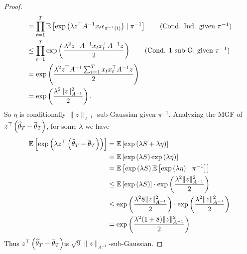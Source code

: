 \begin{proof}
\begin{align*}
    &=  \prod_{t=1}^T\mathbb{E}\left[\exp\left(\lambda z^\top A^{-1}x_{t}\epsilon_{\pi^{-1}(t)}\right) \mid \pi^{-1} \right]  \tag{Cond. Ind. given  $\pi^{-1}$} \\
    &\leq \prod_{t=1}^T\exp\left(\frac{\lambda^2 z^\top A^{-1}x_{t}x_{t}^\top A^{-1} z}{2}\right)  \tag{Cond. 1-sub-G. given $\pi^{-1}$} \\
    &= \exp\left(\frac{\lambda^2 z^\top A^{-1}\sum_{t=1}^Tx_{t}x_{t}^\top A^{-1} z}{2}\right)\\
    &= \exp\left(\frac{\lambda^2 \|z\|_{A^{-1}}^2}{2}\right).    
\end{align*}
So $\eta$ is conditionally $\|z\|_{A^{-1}}$-sub-Gaussian given $\pi^{-1}$. Analyzing the MGF of $z^\top\left(\widehat{\theta}_T -\overline{\theta}_{T}\right)$, for some $\lambda$ we have \begin{align*}
    \mathbb{E} \left[\exp\left(\lambda z^\top\left(\widehat{\theta}_T -\overline{\theta}_{T}\right)\right)\right] &= \mathbb{E} \left[\exp\left(\lambda S + \lambda \eta\right)\right] \\
    &= \mathbb{E} \left[\exp\left(\lambda S\right)\exp\left(\lambda\eta\right)\right]\\
    &= \mathbb{E} \left[\exp\left(\lambda S\right)\mathbb{E} \left[\exp\left(\lambda\eta\right) \mid \pi^{-1}\right]\right] \\
    &\leq \mathbb{E} \left[\exp\left(\lambda S\right)\right] \cdot \exp\left(\frac{\lambda^2 \|z\|_{A^{-1}}^2}{2}\right)\\
    &\leq  \exp\left(\frac{\lambda^28\|z\|_{A^{-1}}^2}{2}\right)\cdot \exp\left(\frac{\lambda^2 \|z\|_{A^{-1}}^2}{2}\right) \\
    &= \exp\left(\frac{\lambda^2(1+8)\|z\|_{A^{-1}}^2}{2}\right).
    \end{align*}
    Thus $z^\top\left(\widehat{\theta}_T -\overline{\theta}_{T}\right)$is $\sqrt{9}\|z\|_{A^{-1}}$-sub-Gaussian.
\end{proof}

